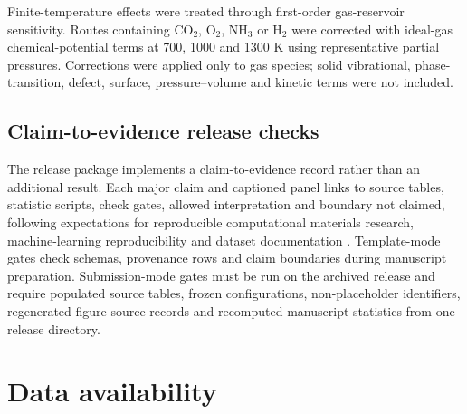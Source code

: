 \documentclass[11pt, letterpaper]{article}
\begin{document}
Finite-temperature effects were treated through first-order gas-reservoir sensitivity. Routes containing CO$_2$, O$_2$, NH$_3$ or H$_2$ were corrected with ideal-gas chemical-potential terms at 700, 1000 and 1300 K using representative partial pressures. Corrections were applied only to gas species; solid vibrational, phase-transition, defect, surface, pressure--volume and kinetic terms were not included.

\subsection*{Claim-to-evidence release checks}

The release package implements a claim-to-evidence record rather than an additional result. Each major claim and captioned panel links to source tables, statistic scripts, check gates, allowed interpretation and boundary not claimed, following expectations for reproducible computational materials research, machine-learning reproducibility and dataset documentation \cite{wilkinson2016fair,lejaeghere2016dft_reproducibility,coudert2017reproducible_research,pineau2021reproducibility,gebru2021datasheets}. Template-mode gates check schemas, provenance rows and claim boundaries during manuscript preparation. Submission-mode gates must be run on the archived release and require populated source tables, frozen configurations, non-placeholder identifiers, regenerated figure-source records and recomputed manuscript statistics from one release directory.



\section*{Data availability}
\end{document}
